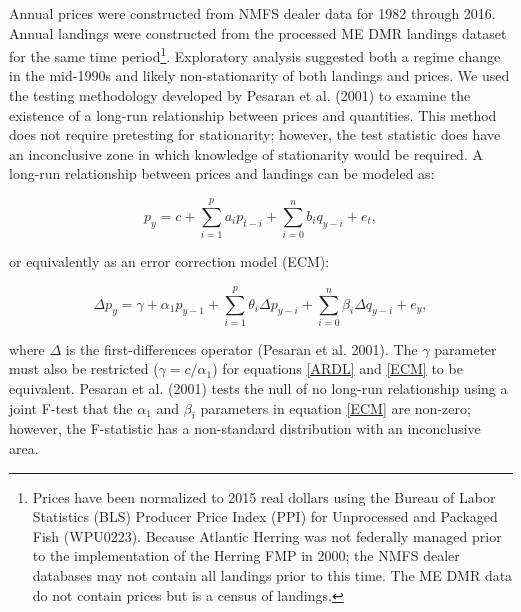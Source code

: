 \documentclass[]{article}
\let\rmarkdownfootnote\footnote%
\def\footnote{\protect\rmarkdownfootnote}
\begin{document}
Annual prices were constructed from NMFS dealer data for 1982 through
2016. Annual landings were constructed from the processed ME DMR
landings dataset for the same time period\footnote{Prices have been
  normalized to 2015 real dollars using the Bureau of Labor Statistics
  (BLS) Producer Price Index (PPI) for Unprocessed and Packaged Fish
  (WPU0223). Because Atlantic Herring was not federally managed prior to
  the implementation of the Herring FMP in 2000; the NMFS dealer
  databases may not contain all landings prior to this time. The ME DMR
  data do not contain prices but is a census of landings.}. Exploratory
analysis suggested both a regime change in the mid-1990s and likely
non-stationarity of both landings and prices. We used the testing
methodology developed by Pesaran et al. (2001) to examine the existence
of a long-run relationship between prices and quantities. This method
does not require pretesting for stationarity; however, the test
statistic does have an inconclusive zone in which knowledge of
stationarity would be required. A long-run relationship between prices
and landings can be modeled as:

\begin{equation}
\label{ARDL}
p_{y}= c+\sum_{i=1}^p a_i p_{t-i}+ \sum_{i=0}^n b_i q_{y-i} + e_{t},
\end{equation}

or equivalently as an error correction model (ECM):

\begin{equation}
\label{ECM}
\Delta p_y= \gamma+ \alpha_1 p_{y-1} + \sum_{i=1}^p \theta_i \Delta p_{y-i}+ \sum_{i=0}^n  \beta_i \Delta q_{y-i} + e_{y},
\end{equation}

where \(\Delta\) is the first-differences operator (Pesaran et al.
2001). The \(\gamma\) parameter must also be restricted
(\(\gamma=c / \alpha_1\)) for equations \ref{ARDL} and \ref{ECM} to be
equivalent. Pesaran et al. (2001) tests the null of no long-run
relationship using a joint F-test that the \(\alpha_1\) and \(\beta_i\)
parameters in equation \ref{ECM} are non-zero; however, the F-statistic
has a non-standard distribution with an inconclusive area.
\end{document}
